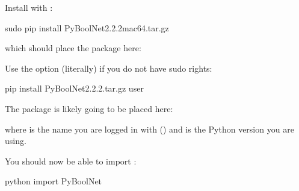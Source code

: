 \documentclass[letterpaper,10pt,english]{sphinxmanual}
\begin{document}
Install  with :

\begin{sphinxVerbatim}[commandchars=\\\{\}]
\PYGZdl{} sudo pip install PyBoolNet\PYGZhy{}2.2.2\PYGZus{}mac64.tar.gz
\end{sphinxVerbatim}

which should place the package here:

\begin{sphinxVerbatim}[commandchars=\\\{\}]
\end{sphinxVerbatim}

Use the option  (literally) if you do not have sudo rights:

\begin{sphinxVerbatim}[commandchars=\\\{\}]
\PYGZdl{} pip install PyBoolNet\PYGZhy{}2.2.2.tar.gz \PYGZhy{}\PYGZhy{}user
\end{sphinxVerbatim}

The package is likely going to be placed here:

\begin{sphinxVerbatim}[commandchars=\\\{\}]
\end{sphinxVerbatim}

where  is the name you are logged in with () and  is the Python version you are using.

You should now be able to import :

\begin{sphinxVerbatim}[commandchars=\\\{\}]
\PYGZdl{} python
\PYGZgt{}\PYGZgt{}\PYGZgt{} import PyBoolNet
\end{sphinxVerbatim}
\end{document}
